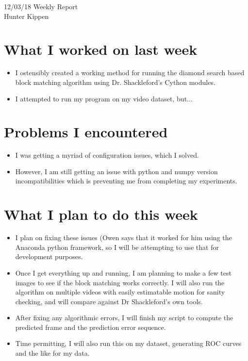 \documentclass[12pt]{article}%
\def\bi{\begin{itemize}     %
\vspace{-0.5em}\setlength\itemsep{0em}}
\begin{document}
\begin{center}
{\LARGE 12/03/18 Weekly Report}\\
\vspace{0.5em}
{\Large Hunter Kippen}
\vspace{0.5em}
\end{center}


\section{What I worked on last week}
\bi
\item I ostensibly created a working method for running the diamond search based block matching algorithm using Dr. Shackleford's Cython modules.
\item I attempted to run my program on my video dataset, but...
\end{itemize}



\section{Problems I encountered}
\bi
\item I was getting a myriad of configuration issues, which I solved.
\item However, I am still getting an issue with python and numpy version incompatibilities which
is preventing me from completing my experiments.
\end{itemize}

\section{What I plan to do this week}
\bi
\item I plan on fixing these issues (Owen says that it worked for him using the Anaconda python
framework, so I will be attempting to use that for development purposes.
\item Once I get everything up and running, I am planning to make a few test images to see if the block matching works correctly. I will also run the algorithm on multiple videos with easily estimatable motion for sanity checking, and will compare against Dr Shackleford's own tools.
\item After fixing any algorithmic errors, I will finish my script to compute the predicted frame and the prediction error sequence.
\item Time permitting, I will also run this on my dataset, generating ROC curves and the like for my data.
\end{itemize}



\begin{comment}
\pagebreak
%


%
\end{comment}
\end{document}
